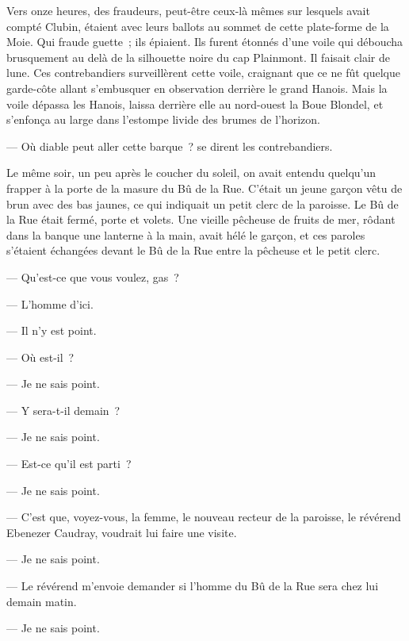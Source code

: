 \documentclass[french,twoside]{book} %
\begin{document}
Vers onze heures, des fraudeurs, peut-être ceux-là mêmes sur lesquels avait compté Clubin, étaient avec leurs ballots au sommet de cette plate-forme de la Moie. Qui fraude guette ; ils épiaient. Ils furent étonnés d’une voile qui déboucha brusquement au delà de la silhouette noire du cap Plainmont. Il faisait clair de lune. Ces contrebandiers surveillèrent cette voile, craignant que ce ne fût quelque garde-côte allant s’embusquer en observation derrière le grand Hanois. Mais la voile dépassa les Hanois, laissa derrière elle au nord-ouest la Boue Blondel, et s’enfonça au large dans l’estompe livide des brumes de l’horizon.\par
— Où diable peut aller cette barque ? se dirent les contrebandiers.\par
Le même soir, un peu après le coucher du soleil, on avait entendu quelqu’un frapper à la porte de la masure du Bû de la Rue. C’était un jeune garçon vêtu de brun avec des bas jaunes, ce qui indiquait un petit clerc de la paroisse. Le Bû de la Rue était fermé, porte et volets. Une vieille pêcheuse de fruits de mer, rôdant dans la banque une lanterne à la main, avait hélé le garçon, et ces paroles s’étaient échangées  devant le Bû de la Rue entre la pêcheuse et le petit clerc.\par
— Qu’est-ce que vous voulez, gas ?\par
— L’homme d’ici.\par
— Il n’y est point.\par
— Où est-il ?\par
— Je ne sais point.\par
— Y sera-t-il demain ?\par
— Je ne sais point.\par
— Est-ce qu’il est parti ?\par
— Je ne sais point.\par
— C’est que, voyez-vous, la femme, le nouveau recteur de la paroisse, le révérend Ebenezer Caudray, voudrait lui faire une visite.\par
— Je ne sais point.\par
— Le révérend m’envoie demander si l’homme du Bû de la Rue sera chez lui demain matin.\par
— Je ne sais point.
\end{document}
